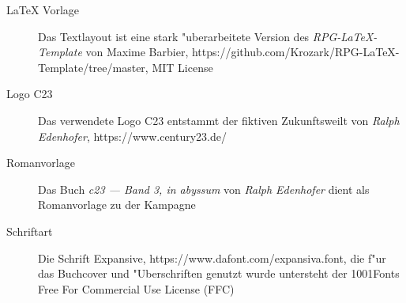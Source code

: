 
\newpage
\pagestyle{empty}


\begin{description}
    \item [LaTeX Vorlage] Das Textlayout ist eine stark "uberarbeitete Version des \textit{RPG-LaTeX-Template} von 
        Maxime Barbier, https://github.com/Krozark/RPG-LaTeX-Template/tree/master, MIT License
    \item [Logo C23] Das verwendete Logo C23 entstammt der fiktiven Zukunftsweilt von \emph{Ralph  Edenhofer}, 
        \newline{}https://www.century23.de/
    \item [Romanvorlage] Das Buch \emph{c23 --- Band 3, in abyssum} von \emph{Ralph  Edenhofer} dient als Romanvorlage 
        zu der Kampagne
    \item [Schriftart] Die Schrift Expansive, https://www.dafont.com/expansiva.font, die f"ur das Buchcover und 
        "Uberschriften genutzt wurde untersteht der 1001Fonts Free For Commercial Use License (FFC)    
\end{description}